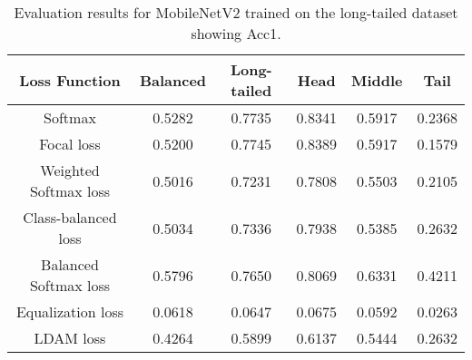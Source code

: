 \begin{table}[H]
    \centering
    \begin{tabular}{cccccc}
        \toprule
        Loss Function & Balanced & Long-tailed & Head & Middle & Tail \\ 
        \midrule
        Softmax   & 0.5282   & 0.7735 & 0.8341 & 0.5917 & 0.2368 \\
        Focal loss   & 0.5200   & 0.7745 & 0.8389 & 0.5917 & 0.1579 \\
        Weighted Softmax loss   & 0.5016   & 0.7231 & 0.7808 & 0.5503 & 0.2105 \\
        Class-balanced loss   &  0.5034  & 0.7336 & 0.7938 & 0.5385 & 0.2632 \\
        Balanced Softmax loss   & 0.5796   & 0.7650 & 0.8069 & 0.6331 & 0.4211 \\
        Equalization loss   &   0.0618 & 0.0647 & 0.0675 & 0.0592 & 0.0263 \\
        LDAM loss   & 0.4264 & 0.5899 & 0.6137 & 0.5444 & 0.2632 \\
        \bottomrule
    \end{tabular}
    \caption{Evaluation results for MobileNetV2 trained on the long-tailed dataset showing Acc1.}
    \label{tab:mobilenet_lt_acc1}
\end{table}

